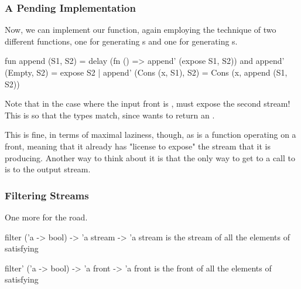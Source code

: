 \documentclass[aspectratio=169]{beamer}
\begin{document}
\begin{frame}[fragile]
  \frametitle{A Pending Implementation}

  Now, we can implement our function, again employing the technique of
  two different functions, one for generating s and one for
  generating s.

  \pause
  \vspace{\fill}

  \begin{codeblock}
    fun append  (S1, S2) =
      delay (fn () => append' (expose S1, S2))
    and append' (Empty, S2) = expose S2
      | append' (Cons (x, S1), S2) = Cons (x, append (S1, S2))
  \end{codeblock}

  \pause
  \vspace{\fill}

  Note that in the case where the input front is , 
  must expose the second stream! This is so that the types match, since 
  wants to return an .

  \pause
  \vspace{\fill}

  This is fine, in terms of maximal laziness, though, as  is a
  function operating on a front, meaning that it already has "license to expose"
  the stream that it is producing. Another way to think about it is that
  the only way to get to a call to  is to  the
  output stream.
\end{frame}

\begin{frame}[fragile]
  \frametitle{Filtering Streams}

  One more for the road.

  \pause
  \vspace{\fill}

  \spec
    {filter}
    {('a -> bool) -> 'a stream -> 'a stream}
    {}
    { is the stream of all the elements of  satisfying }

  \vspace{\fill}

  \spec
    {filter'}
    {('a -> bool) -> 'a front -> 'a front}
    {}
    { is the front of all the elements of  satisfying }
\end{frame}
\end{document}
